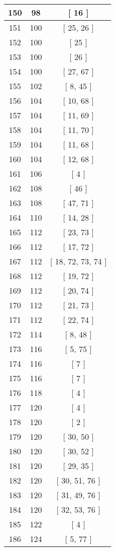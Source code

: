\begin{center}
\begin{longtable}[H]{|| c c c ||}
150 & 98 & [ 16 ]
\\\hline
151 & 100 & [ 25, 26 ]
\\\hline
152 & 100 & [ 25 ]
\\\hline
153 & 100 & [ 26 ]
\\\hline
154 & 100 & [ 27, 67 ]
\\\hline
155 & 102 & [ 8, 45 ]
\\\hline
156 & 104 & [ 10, 68 ]
\\\hline
157 & 104 & [ 11, 69 ]
\\\hline
158 & 104 & [ 11, 70 ]
\\\hline
159 & 104 & [ 11, 68 ]
\\\hline
160 & 104 & [ 12, 68 ]
\\\hline
161 & 106 & [ 4 ]
\\\hline
162 & 108 & [ 46 ]
\\\hline
163 & 108 & [ 47, 71 ]
\\\hline
164 & 110 & [ 14, 28 ]
\\\hline
165 & 112 & [ 23, 73 ]
\\\hline
166 & 112 & [ 17, 72 ]
\\\hline
167 & 112 & [ 18, 72, 73, 74 ]
\\\hline
168 & 112 & [ 19, 72 ]
\\\hline
169 & 112 & [ 20, 74 ]
\\\hline
170 & 112 & [ 21, 73 ]
\\\hline
171 & 112 & [ 22, 74 ]
\\\hline
172 & 114 & [ 8, 48 ]
\\\hline
173 & 116 & [ 5, 75 ]
\\\hline
174 & 116 & [ 7 ]
\\\hline
175 & 116 & [ 7 ]
\\\hline
176 & 118 & [ 4 ]
\\\hline
177 & 120 & [ 4 ]
\\\hline
178 & 120 & [ 2 ]
\\\hline
179 & 120 & [ 30, 50 ]
\\\hline
180 & 120 & [ 30, 52 ]
\\\hline
181 & 120 & [ 29, 35 ]
\\\hline
182 & 120 & [ 30, 51, 76 ]
\\\hline
183 & 120 & [ 31, 49, 76 ]
\\\hline
184 & 120 & [ 32, 53, 76 ]
\\\hline
185 & 122 & [ 4 ]
\\\hline
186 & 124 & [ 5, 77 ]
\\\hline

\end{longtable}
\end{center}
